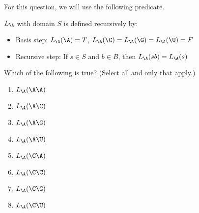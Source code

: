 
For this question, we will use the following predicate.

$L_{\A}$ with domain $S$ is defined recursively by: 
\begin{itemize}
\item[]Basis step: $L_{\A}(\A) = T$, $L_{\A}(\C) = L_{\A}(\G) = L_{\A}(\U) = F$
\item[]Recursive step: If $s \in S$ and $b \in B$, then $L_{\A}(sb) = L_{\A}(s)$
\end{itemize}

Which of the following is true? (Select  all and only that apply.)
 \begin{enumerate}
    \item $L_{\A} ( \A\A)$
    \item $L_{\A} ( \A\C)$
    \item $L_{\A} ( \A\G)$
    \item $L_{\A} ( \A\U)$
    \item $L_{\A} ( \C\A)$
    \item $L_{\A} ( \C\C)$
    \item $L_{\A} ( \C\G)$
    \item $L_{\A} ( \C\U)$
 \end{enumerate}    
